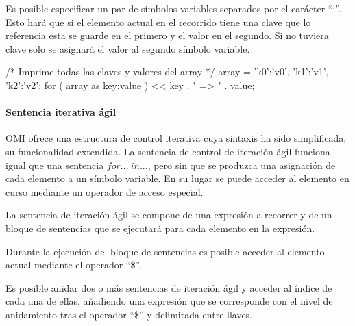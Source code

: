 Es posible especificar un par de símbolos variables separados por el carácter ``:''. Esto hará que si el elemento actual en el recorrido tiene una clave que lo referencia esta se guarde en 
el primero y el valor en el segundo. Si no tuviera clave solo se asignará el valor al segundo símbolo variable. \\


\begin{myverbatim}
   /*
      Imprime todas las 
      claves y valores del array
   */
   array = {'k0':'v0', 'k1':'v1', 'k2':'v2'};
   for ( array as key:value ){
      << key . " => " . value; 
   }
\end{myverbatim}

\paragraph{Sentencia iterativa ágil} \label{sec:stmt_agil}

OMI ofrece una estructura de control iterativa cuya sintaxis ha sido simplificada, su funcionalidad extendida. La sentencia de control de iteración ágil funciona
igual que una sentencia $for...\ in...$, pero sin que se produzca una asignación de cada elemento a un símbolo variable. En su lugar se puede acceder al elemento 
en curso mediante un operador de acceso especial.

La sentencia de iteración ágil se compone de una expresión a recorrer y de un bloque de sentencias que se ejecutará para cada elemento en la expresión. \\


Durante la ejecución del bloque de sentencias es posible acceder al elemento actual mediante el operador ``\$''. \\


Es posible anidar dos o más sentencias de iteración ágil y acceder al índice de cada una de ellas, añadiendo una expresión que se corresponde con el nivel de
anidamiento tras el operador ``\$'' y delimitada entre llaves. \\


